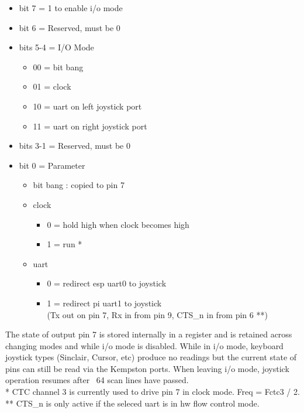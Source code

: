 \begin{itemize}
\item bit 7 = 1 to enable i/o mode
\item bit 6 = Reserved, must be 0
\item bits 5-4 = I/O Mode
  \begin{itemize}
  \item 00 = bit bang
  \item 01 = clock
  \item 10 = uart on left joystick port
  \item 11 = uart on right joystick port
  \end{itemize}
\item bits 3-1 = Reserved, must be 0
\item bit 0 = Parameter
  \begin{itemize}
  \item[] bit bang : copied to pin 7
  \item[] clock
    \begin{itemize}
    \item 0 = hold high when clock becomes high
    \item 1 = run *
    \end{itemize}
  \item[] uart
    \begin{itemize}
    \item 0 = redirect esp uart0 to joystick
    \item 1 = redirect pi uart1 to joystick\\
      (Tx out on pin 7, Rx in from pin 9, CTS\_n in from pin 6 **)
    \end{itemize}
  \end{itemize}
\end{itemize}
The state of output pin 7 is stored internally in a register and is
retained across changing modes and while i/o mode is disabled.  While
in i/o mode, keyboard joystick types (Sinclair, Cursor, etc) produce
no readings but the current state of pins can still be read via the
Kempston ports.  When leaving i/o mode, joystick operation resumes
after ~64 scan lines have passed.\\
* CTC channel 3 is currently used to drive pin 7 in clock mode.  Freq
= Fctc3 / 2.\\
** CTS\_n is only active if the seleced uart is in hw flow control mode.
